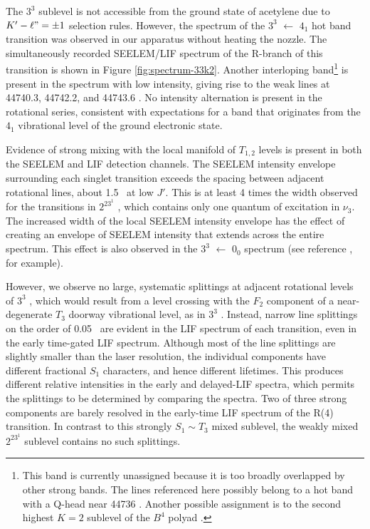 The $3^3$  sublevel is not accessible from the ground state of
acetylene due to $K' - \ell" = \pm 1$ selection rules.  However, the
spectrum of the $3^3$  $\leftarrow$ $4_1$ hot band transition
was observed in our apparatus without heating the nozzle.  The
simultaneously recorded SEELEM/LIF spectrum of the R-branch of this
transition is shown in Figure \ref{fig:spectrum-33k2}.  Another
interloping band\footnote{This band is currently unassigned because it
  is too broadly overlapped by other strong bands.  The lines
  referenced here possibly belong to a hot band with a Q-head near
  44736 \rcm.  Another possible assignment is to the second highest
  $K=2$ sublevel of the $B^4$ polyad \cite{merer-private}.} is present
in the spectrum with low intensity, giving rise to the weak lines at
44740.3, 44742.2, and 44743.6 \rcm.  No intensity alternation is
present in the rotational series, consistent with expectations for a
band that originates from the $4_1$ vibrational level of the ground
electronic state.

Evidence of strong mixing with the local manifold of $T_{1,2}$ levels
is present in both the SEELEM and LIF detection channels.  The SEELEM
intensity envelope surrounding each singlet transition exceeds the
spacing between adjacent rotational lines, about 1.5 \rcm\ at low $J'$.
This is at least 4 times the width observed for the transitions in
$2^23^1$ , which contains only one quantum of excitation in
$\nu_3$.  The increased width of the local SEELEM intensity envelope
has the effect of creating an envelope of SEELEM intensity that
extends across the entire spectrum.  This effect is also observed in
the $3^3$  $\leftarrow$ $0_0$ spectrum (see reference
\cite{humphrey97}, for example).  

However, we observe no large, systematic splittings at adjacent
rotational levels of $3^3$ , which would result from a level
crossing with the $F_2$ component of a near-degenerate $T_3$ doorway
vibrational level, as in $3^3$  \cite{mishra04}.  Instead,
narrow line splittings on the order of 0.05 \rcm\ are evident in the
LIF spectrum of each transition, even in the early time-gated LIF
spectrum.  Although most of the line splittings are slightly smaller
than the laser resolution, the individual components have different
fractional $S_1$ characters, and hence different lifetimes.  This
produces different relative intensities in the early and delayed-LIF
spectra, which permits the splittings to be determined by comparing
the spectra.  Two of three strong components are barely resolved in
the early-time LIF spectrum of the R(4) transition.  In contrast to this
strongly $S_1 \sim T_3$ mixed sublevel, the weakly mixed $2^23^1$
 sublevel contains no such splittings.


